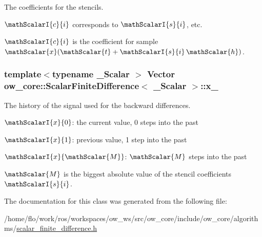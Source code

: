 The coefficients for the stencils. 


\begin{DoxyItemize}
\item $\mathScalarI{c}{i}$ corresponds to $\mathScalarI{s}{i}$, etc.
\item $\mathScalarI{c}{i}$ is the coefficient for sample $\mathScalar{x}(\mathScalar{t} + \mathScalarI{s}{i} \, \mathScalar{h})$. 
\end{DoxyItemize}
\subsubsection[{\texorpdfstring{x\+\_\+}{x_}}]{\setlength{\rightskip}{0pt plus 5cm}template$<$typename \+\_\+\+Scalar $>$ Vector {\bf ow\+\_\+core\+::\+Scalar\+Finite\+Difference}$<$ \+\_\+\+Scalar $>$\+::x\+\_\+\hspace{0.3cm}{\ttfamily [protected]}}\hypertarget{classow__core_1_1ScalarFiniteDifference_a3f7d418f64d44b55cf1f5c2de4830710}{}\label{classow__core_1_1ScalarFiniteDifference_a3f7d418f64d44b55cf1f5c2de4830710}


The history of the signal used for the backward differences. 


\begin{DoxyItemize}
\item $\mathScalarI{x}{0}$\+: the current value, 0 steps into the past
\item $\mathScalarI{x}{1}$\+: previous value, 1 step into the past
\item $\mathScalarI{x}{\mathScalar{M}}$\+: $\mathScalar{M}$ steps into the past

$\mathScalar{M}$ is the biggest absolute value of the stencil coefficients $\mathScalarI{s}{i}$. 
\end{DoxyItemize}

The documentation for this class was generated from the following file\+:\begin{DoxyCompactItemize}
\item 
/home/flo/work/ros/workspaces/ow\+\_\+ws/src/ow\+\_\+core/include/ow\+\_\+core/algorithms/\hyperlink{scalar__finite__difference_8h}{scalar\+\_\+finite\+\_\+difference.\+h}\end{DoxyCompactItemize}
